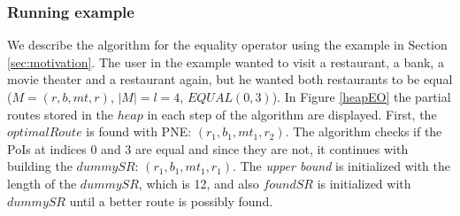 \subsubsection{Running example}
We describe the algorithm for the equality operator using the example in Section \ref{sec:motivation}. The user in the example wanted to visit a restaurant, a bank, a movie theater and a restaurant again, but he wanted both restaurants to be equal ($M = (r, b, mt, r)$, $|M| = l = 4$, $EQUAL(0, 3)$). In Figure \ref{heapEO} the partial routes stored in the $heap$ in each step of the algorithm are displayed.
First, the $optimalRoute$ is found with PNE: $(r_1, b_1, mt_1, r_2)$. The algorithm checks if the PoIs at indices 0 and 3 are equal and since they are not, it continues with building the $dummySR$: $(r_1, b_1, mt_1, r_1)$. The \textit{upper bound} is initialized with the length of the $dummySR$, which is 12, and also $foundSR$ is initialized with $dummySR$ until a better route is possibly found.
